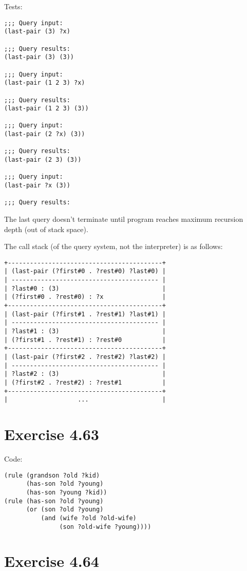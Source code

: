 \documentclass[../main.tex]{subfiles}
\begin{document}
Tests:
\begin{lstlisting}
;;; Query input:
(last-pair (3) ?x)

;;; Query results:
(last-pair (3) (3))

;;; Query input:
(last-pair (1 2 3) ?x)

;;; Query results:
(last-pair (1 2 3) (3))

;;; Query input:
(last-pair (2 ?x) (3))

;;; Query results:
(last-pair (2 3) (3))

;;; Query input:
(last-pair ?x (3))

;;; Query results:
\end{lstlisting}

The last query doesn't terminate until program reaches maximum recursion depth (out of stack space).

The call stack (of the query system, not the interpreter) is as follows:

\begin{lstlisting}
+------------------------------------------+
| (last-pair (?first#0 . ?rest#0) ?last#0) |
| ---------------------------------------- |
| ?last#0 : (3)                            |
| (?first#0 . ?rest#0) : ?x                |
+------------------------------------------+
| (last-pair (?first#1 . ?rest#1) ?last#1) |
| ---------------------------------------- |
| ?last#1 : (3)                            |
| (?first#1 . ?rest#1) : ?rest#0           |
+------------------------------------------+
| (last-pair (?first#2 . ?rest#2) ?last#2) |
| ---------------------------------------- |
| ?last#2 : (3)                            |
| (?first#2 . ?rest#2) : ?rest#1           |
+------------------------------------------+
|                   ...                    |
\end{lstlisting}

\section{Exercise 4.63}

Code:

\begin{lstlisting}
(rule (grandson ?old ?kid)
      (has-son ?old ?young)
      (has-son ?young ?kid))
(rule (has-son ?old ?young)
      (or (son ?old ?young)
          (and (wife ?old ?old-wife)
               (son ?old-wife ?young))))
\end{lstlisting}

\section{Exercise 4.64}
\end{document}
